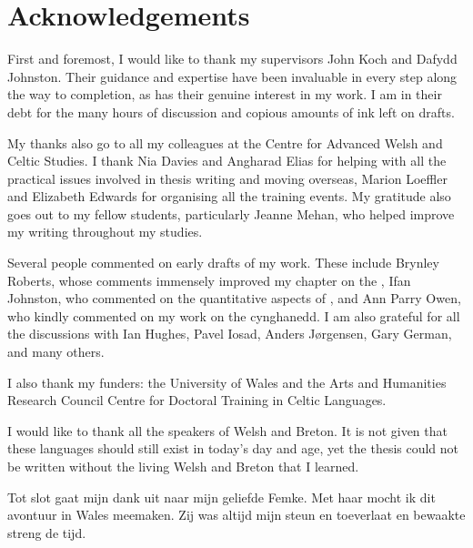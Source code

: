 \chapter*{Acknowledgements}%
\label{cha:ack}

First and foremost, I would like to thank my supervisors John Koch and Dafydd Johnston. Their guidance and expertise have been invaluable in every step along the way to completion, as has their genuine interest in my work. I am in their debt for the many hours of discussion and copious amounts of ink left on drafts.

My thanks also go to all my colleagues at the Centre for Advanced Welsh and Celtic Studies. I thank Nia Davies and Angharad Elias for helping with all the practical issues involved in thesis writing  and moving overseas, Marion Loeffler and Elizabeth Edwards for organising all the  training events. My gratitude also goes out to my fellow students, particularly Jeanne Mehan, who helped improve my writing throughout my studies.

Several people commented on early drafts of my work. These include Brynley Roberts, whose comments  immensely improved my chapter on the , Ifan Johnston, who commented on the quantitative aspects of , and Ann Parry Owen, who kindly commented on my work on the cynghanedd. I am also grateful for all the  discussions with  Ian Hughes, Pavel Iosad, Anders Jørgensen, Gary German, and many others.

I also thank my funders: the University of Wales and the Arts and Humanities Research Council Centre for Doctoral Training in Celtic Languages. 

I would like to thank all the speakers of Welsh and Breton. It is not given that these languages should still exist in today's day and age, yet the thesis could not be written without the living Welsh and Breton that I learned.

Tot slot gaat mijn dank uit naar mijn geliefde Femke. Met haar mocht ik dit avontuur in Wales meemaken. Zij was altijd mijn steun en toeverlaat en bewaakte streng de tijd. 


